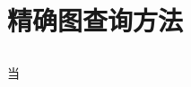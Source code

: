 \documentclass{XDBAthesis}
\begin{document}
\else
\fi
\chapter{精确图查询方法}
\label{chap:introduction}
\section{}
当

\ifx\allfiles\undefined
%
%
\end{document}
